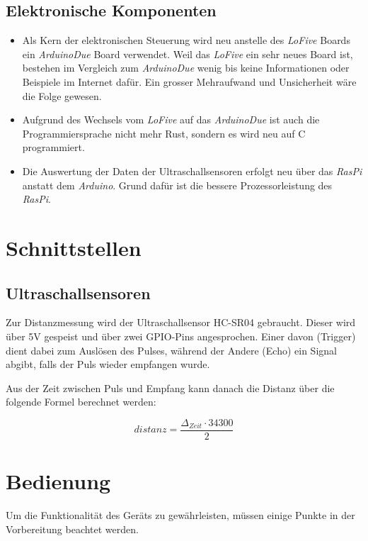 \documentclass[a4paper]{report}
\begin{document}
\subsection{Elektronische Komponenten}

\begin{itemize}
		\item Als Kern der elektronischen Steuerung wird neu anstelle des \textit{LoFive} Boards ein \textit{ArduinoDue} Board verwendet. Weil das \textit{LoFive} ein sehr neues Board ist, bestehen im Vergleich zum \textit{ArduinoDue} wenig bis keine Informationen oder Beispiele im Internet dafür. Ein grosser Mehraufwand und Unsicherheit wäre die Folge gewesen.
		\item Aufgrund des Wechsels vom \textit{LoFive} auf das \textit{ArduinoDue} ist auch die Programmiersprache nicht mehr Rust, sondern es wird neu auf C programmiert.
		\item Die Auswertung der Daten der Ultraschallsensoren erfolgt neu über das \textit{RasPi} anstatt dem \textit{Arduino}. Grund dafür ist die bessere Prozessorleistung des \textit{RasPi}.
\end{itemize}


\section{Schnittstellen}
\label{sec:Schnittstellen}

\subsection{Ultraschallsensoren}
\label{ssec:UltrasonicSensorInterface}

Zur Distanzmessung wird der Ultraschallsensor HC-SR04 gebraucht. Dieser wird über 5V gespeist und über zwei GPIO-Pins angesprochen. Einer davon (Trigger) dient dabei zum Auslösen des Pulses, während der Andere (Echo) ein Signal abgibt, falls der Puls wieder empfangen wurde.

Aus der Zeit zwischen Puls und Empfang kann danach die Distanz über die folgende Formel berechnet werden:

\begin{equation*}
	distanz = \frac{\Delta_{Zeit} \cdot 34300}{2}
\end{equation*}

\section{Bedienung}
\label{sec:Bedienung}
Um die Funktionalität des Geräts zu gewährleisten, müssen einige Punkte in der Vorbereitung beachtet werden.
\end{document}
